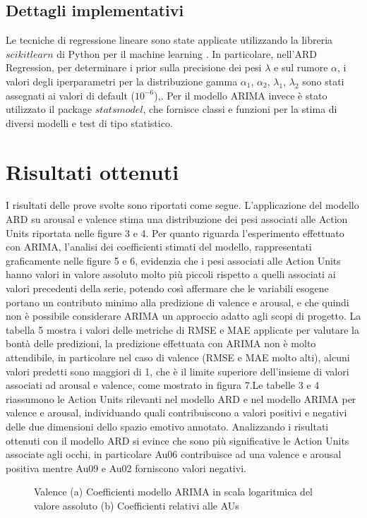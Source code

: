 \documentclass[10pt,journal,compsoc]{IEEEtran}
\begin{document}
\subsection{Dettagli implementativi}
Le tecniche di regressione lineare sono state applicate utilizzando la libreria \(scikitlearn\)  di Python per il machine learning \cite{scikit}. In particolare, nell'ARD Regression, per determinare i prior sulla precisione dei pesi \(\lambda\) e sul rumore \(\alpha\),  i valori degli iperparametri per la distribuzione gamma \(\alpha_1\), \(\alpha_2\), \(\lambda_1\), \(\lambda_2\) sono stati assegnati ai valori di default (\(10^{-6}\)),.
Per il modello ARIMA invece è stato utilizzato il package \(statsmodel\), che fornisce classi e funzioni per la stima di diversi modelli e test di tipo statistico.
\section{Risultati ottenuti}\label{sec:risultati}
\IEEEPARstart{}
I risultati delle prove svolte sono riportati come segue. L'applicazione del modello ARD su arousal e valence stima una distribuzione dei pesi associati alle Action Units riportata nelle figure 3 e 4. Per quanto riguarda l'esperimento effettuato con ARIMA, l'analisi dei coefficienti stimati del modello, rappresentati graficamente nelle figure 5 e 6, evidenzia che i pesi associati alle Action Units hanno valori in valore assoluto molto più piccoli rispetto a quelli associati ai valori precedenti della serie, potendo così affermare che le variabili esogene portano un contributo minimo alla predizione di valence e arousal, e che quindi non è possibile considerare ARIMA un approccio adatto agli scopi di progetto.
La tabella 5 mostra i valori delle metriche di RMSE e MAE applicate per valutare la bontà delle predizioni, la predizione effettuata con ARIMA non è molto attendibile, in particolare nel caso di valence (RMSE e MAE molto alti), alcuni valori predetti sono maggiori di 1, che è il limite superiore dell'insieme di valori associati ad arousal e valence, come mostrato in figura 7.Le tabelle 3 e 4 riassumono le Action Units rilevanti nel modello ARD e nel modello ARIMA per valence e arousal, individuando quali contribuiscono a valori positivi e negativi delle due dimensioni dello spazio emotivo annotato. Analizzando i risultati ottenuti con il modello ARD si evince che sono più significative le Action Units associate agli occhi, in particolare Au06 contribuisce ad una valence e arousal positiva mentre Au09 e Au02 forniscono valori negativi.
\begin{figure*}[!h]
    \centering
    
  \caption{Valence (a) Coefficienti modello ARIMA in scala logaritmica del valore assoluto (b) Coefficienti relativi alle AUs}
    \label{fig:pacf}
\end{figure*}
\end{document}
